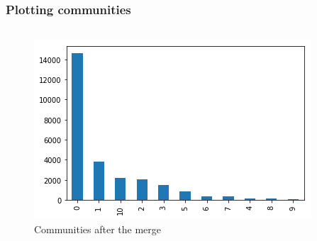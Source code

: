 \documentclass[12pt, a4paper]{article}
\begin{document}
\subsubsection{Plotting communities}

\bgroup
  \inputminted[linenos, breaklines=true, fontsize=\scriptsize]{python}{src/youtube/datashader/communities/1_merging.py}
  \label{listing:youtube_ds_com_1}
\egroup

\begin{figure}[H]
    \centering
    \includegraphics[width=\textwidth]{src/youtube/datashader/communities/new_communities}
    \caption{Communities after the merge}
    \label{fig:youtube_ds_com_merge}
\end{figure}

\bgroup
  \inputminted[linenos, breaklines=true, fontsize=\scriptsize, firstnumber=last]{python}{src/youtube/datashader/communities/2_plotting.py}
  \label{listing:youtube_ds_com_2}
\egroup
\end{document}
